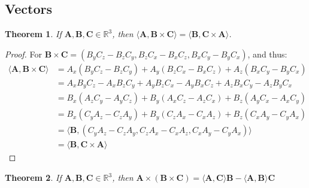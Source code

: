 \documentclass[oneside]{book}
\theoremstyle{mystyle}
\newtheorem{theorem}{Theorem}[section]
\begin{document}
\subsection{Vectors}
\begin{theorem}
If $\mathbf{A},\mathbf{B},\mathbf{C}\in \mathbb{R}^{3}$, then $\langle \mathbf{A},\mathbf{B}\times \mathbf{C}\rangle = \langle \mathbf{B}, \mathbf{C}\times \mathbf{A}\rangle$.
\end{theorem}
\begin{proof}
For $\mathbf{B}\times \mathbf{C} = (B_{y}C_{z} - B_{z}C_{y},B_{z}C_{x}-B_{x}C_{z},B_{x}C_{y} - B_{y}C_{x})$, and thus: \begin{align*}
    \langle \mathbf{A},\mathbf{B}\times \mathbf{C}\rangle &= A_{x}(B_{y}C_{z} - B_{z}C_{y}) + A_{y}(B_{z}C_{x} - B_{x}C_{z}) + A_{z}(B_{x}C_{y}-B_{y}C_{x})\\
    &= A_{x}B_{y}C_{z} - A_{x}B_{z}C_{y} + A_{y}B_{z}C_{x} - A_{y}B_{x}C_{z} + A_{z}B_{x}C_{y} - A_{z}B_{y}C_{x}\\
    &= B_{x}(A_{z}C_{y} - A_{y}C_{z}) + B_{y}(A_{x}C_{z} - A_{z}C_{x}) + B_{z}(A_{y}C_{x} - A_{x}C_{y})\\
    &= B_{x}(C_{y}A_{z} - C_{z}A_{y}) + B_{y}(C_{z}A_{x} - C_{x}A_{z}) + B_{z}(C_{x}A_{y} - C_{y}A_{x})\\
    &= \langle \mathbf{B}, (C_{y}A_{z} - C_{z}A_{y}, C_{z}A_{x} - C_{x}A_{z}, C_{x}A_{y} - C_{y}A_{x})\rangle\\
    &= \langle \mathbf{B},\mathbf{C}\times \mathbf{A}\rangle
\end{align*}
\end{proof}
\begin{theorem}
If $\mathbf{A},\mathbf{B},\mathbf{C}\in \mathbb{R}^3$, then $ \mathbf{A}\times(\mathbf{B}\times \mathbf{C}) = \langle \mathbf{A},\mathbf{C}\rangle \mathbf{B} - \langle \mathbf{A},\mathbf{B}\rangle \mathbf{C}$
\end{theorem}
\end{document}
